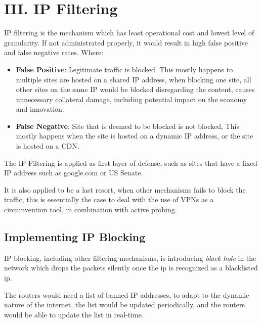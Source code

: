 \documentclass[nonacm,sigplan,screen]{acmart}
\begin{document}

\hypertarget{iii.-ip-filtering}{%
\section{III. IP Filtering}\label{iii.-ip-filtering}}

IP filtering is the mechanism which has least operational cost and
lowest level of granularity. \cite{07_taxonomy} If not administrated
properly, it would result in high false positive and false negative
rates. Where:

\begin{itemize}
\tightlist
\item
  \textbf{False Positive}: Legitimate traffic is blocked. This mostly
  happens to multiple sites are hosted on a shared IP address, when
  blocking one site, all other sites on the same IP would be blocked
  disregarding the content, causes unnecessary collateral damage,
  including potential impact on the economy and innovation.
\item
  \textbf{False Negative}: Site that is deemed to be blocked is not
  blocked, This mostly happens when the site is hosted on a dynamic IP
  address, or the site is hosted on a CDN.
\end{itemize}

The IP Filtering is applied as first layer of defense, such as sites
that have a fixed IP address such as google.com or US Senate.

It is also applied to be a last resort, when other mechanisms fails to
block the traffic, this is essentially the case to deal with the use of
VPNs as a circumvention tool, in combination with active probing.

\hypertarget{implementing-ip-blocking}{%
\subsection{Implementing IP
Blocking}\label{implementing-ip-blocking}}

IP blocking, including other filtering mechanisms, is introducing
\emph{black hole} in the network which drops the packets silently once
the ip is recognized as a blacklisted ip.

The routers would need a list of banned IP addresses, to adapt to the
dynamic nature of the internet, the list would be updated periodically,
and the routers would be able to update the list in real-time.
\end{document}
